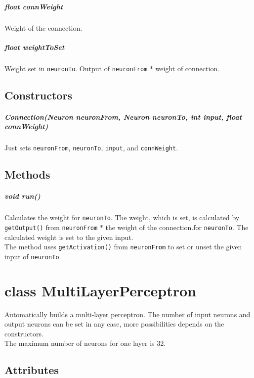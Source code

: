 \paragraph{float connWeight}
Weight of the connection.

\paragraph{float weightToSet}
Weight set in \texttt{neuronTo}. Output of \texttt{neuronFrom} $*$ weight of connection.

\section{Constructors}
\paragraph{Connection(Neuron neuronFrom, Neuron neuronTo, int input, float connWeight)}
Just sets \texttt{neuronFrom}, \texttt{neuronTo}, \texttt{input}, and \texttt{connWeight}.

\section{Methods}
\paragraph{void run()}
Calculates the weight for \texttt{neuronTo}. The weight, which is set, is calculated by \texttt{getOutput()} from \texttt{neuronFrom} $*$ the weight of the connection.for \texttt{neuronTo}. The calculated weight is set to the given input.\\
The method uses \texttt{getActivation()} from \texttt{neuronFrom} to set or unset the given input of \texttt{neuronTo}.

\chapter{class MultiLayerPerceptron}
Automatically builds a multi-layer perceptron. The number of input neurons and output neurons can be set in any case, more possibilities depends on the constructors.\\
The maximum number of neurons for one layer is 32.

\section{Attributes}
